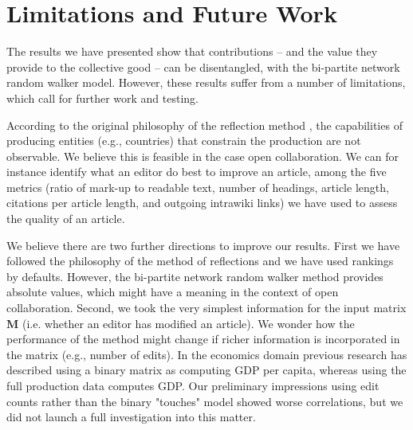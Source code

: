 \section{Limitations and Future Work}
The results we have presented show that contributions -- and the value they provide to the collective good -- can be disentangled, with the {bi-partite network random walker} model. However, these results suffer from a number of limitations, which call for further work and testing.


According to the original philosophy of the reflection method \cite{hidalgo2007}, the capabilities of producing entities (e.g., countries) that constrain the production are not observable. We believe this is feasible in the case open collaboration. We can for instance identify what an editor do best to improve an article, among the five metrics (ratio of mark-up to readable text, number of headings, article length, citations per article length, and outgoing intrawiki links) we have used to assess the quality of an article.

We believe there are two further directions to improve our results. First we have followed the philosophy of the method of reflections and we have used rankings by defaults. However, the bi-partite network random walker method provides absolute values, which might have a meaning in the context of open collaboration. Second, we took the very simplest information for the input matrix $\mathbf{M}$ (i.e. whether an editor has modified an article). We wonder how the performance of the method might change if richer information is incorporated in the matrix (e.g., number of edits). In the economics domain previous research has described using a binary matrix as computing GDP per capita, whereas using the full production data computes GDP. Our preliminary impressions using edit counts rather than the binary "touches" model showed worse correlations, but we did not launch a full investigation into this matter.

